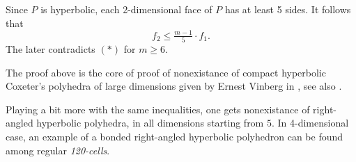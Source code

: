 Since $P$ is hyperbolic, each 2-dimensional face of $P$ has at least 5 sides.
It follows that
\[f_2\le \tfrac{m-1}5\cdot f_1.\]
The later contradicts $({*})$ for $m\ge 6$.

The proof above 
is the core of proof of nonexistance of compact hyperbolic Coxeter's polyhedra of large dimensions 
given by Ernest Vinberg in \cite{vinberg}, see also \cite{vinberg-strong}.

Playing a bit more with the same inequalities, 
one gets nonexistance of  right-angled hyperbolic polyhedra,
in all dimensions starting from $5$.
In 4-dimensional case, an example of a bonded right-angled hyperbolic polyhedron
can be found among regular \emph{120-cells}.






